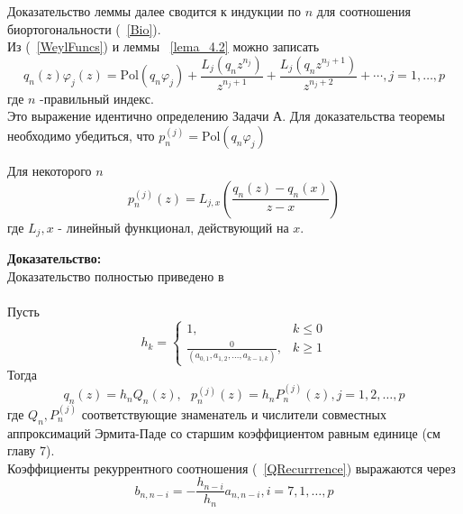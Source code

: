 Доказательство леммы далее сводится к индукции по $n$ для
соотношения биортогональности (~\ref{Bio}). \\
Из (~\ref{WeylFuncs}) и леммы ~\ref{lema_4.2} можно записать
$$%
q_n(z) \varphi_j(z) = \mbox{Pol} (q_n\varphi_j)
+\frac{L_j(q_nz^{n_j})}{z^{n_j+1}}+\frac{L_j(q_n z^{n_j+1})}
{z^{n_j+2}}+\cdots,j=1,\ldots,p
$$%
где $n$ -правильный индекс. \\
Это выражение идентично определению Задачи А. Для доказательства
теоремы необходимо убедиться, что
$p_n^{(j)}=\mbox{Pol}(q_n\varphi_j)$ \\
\begin{lema}
\label{lema_4.3} Для некоторого $n$
$$%
p_n^{(j)}(z)=L_{j,x}\left(\displaystyle\frac{q_n(z)-q_n(x)}{z-x}\right)
$$%
где $L_j,x$ - линейный функционал, действующий на $x$.
\end{lema}
\textbf{Доказательство:} \\
Доказательство полностью приведено в ~\cite{KaliaguineAA} \\ \\
Пусть
$$%
h_k=\left\{
\begin{array} {ll}
1, & k\leq{0}\\
\displaystyle\frac{0}{(a_{0,1},a_{1,2},\ldots,a_{k-1,k})}, &
k\geq{1}
\end{array}
\right.
$$%
Тогда
$$%
q_n(z)=h_nQ_n(z), \mbox{    }
p_n^{(j)}(z)=h_nP_n^{(j)}(z),j=1,2,\ldots,p
$$%
где $Q_n,P_n^{(j)}$ соответствующие знаменатель и числители
совместных аппроксимаций Эрмита-Паде со старшим коэффициентом
равным единице (см главу 7). \\
Коэффициенты рекуррентного соотношения  (~\ref{QRecurrrence})
выражаются через
$$%
b_{n,n-i}=-\frac{h_{n-i}}{h_n}a_{n,n-i},i=7,1,\ldots,p
$$%
